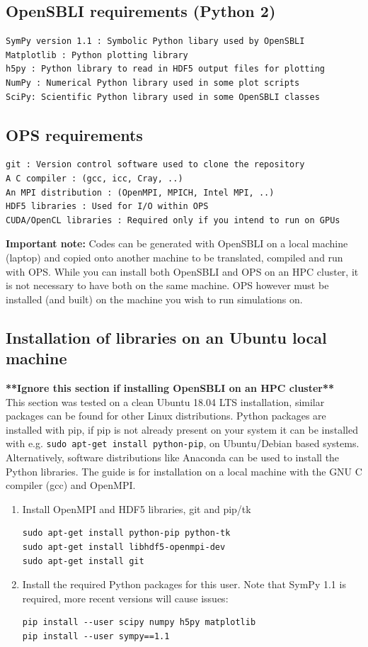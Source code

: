 \documentclass[11pt]{article}
\begin{document}
\subsection*{OpenSBLI requirements (Python 2)}
\begin{verbatim}
SymPy version 1.1 : Symbolic Python libary used by OpenSBLI
Matplotlib : Python plotting library
h5py : Python library to read in HDF5 output files for plotting
NumPy : Numerical Python library used in some plot scripts
SciPy: Scientific Python library used in some OpenSBLI classes
\end{verbatim}
\subsection*{OPS requirements}
\begin{verbatim}
git : Version control software used to clone the repository
A C compiler : (gcc, icc, Cray, ..)
An MPI distribution : (OpenMPI, MPICH, Intel MPI, ..)
HDF5 libraries : Used for I/O within OPS
CUDA/OpenCL libraries : Required only if you intend to run on GPUs
\end{verbatim}
\textbf{Important note:} Codes can be generated with OpenSBLI on a local machine (laptop) and copied onto another machine to be translated, compiled and run with OPS. While you can install both OpenSBLI and OPS on an HPC cluster, it is not necessary to have both on the same machine. OPS however must be installed (and built) on the machine you wish to run simulations on.

\subsection{Installation of libraries on an Ubuntu local machine}
\textbf{**Ignore this section if installing OpenSBLI on an HPC cluster**}\\
This section was tested on a clean Ubuntu 18.04 LTS installation, similar packages can be found for other Linux distributions. Python packages are installed with pip, if pip is not already present on your system it can be installed with e.g. \verb|sudo apt-get install python-pip|, on Ubuntu/Debian based systems. Alternatively, software distributions like Anaconda can be used to install the Python libraries. The guide is for installation on a local machine with the GNU C compiler (gcc) and OpenMPI.

\begin{enumerate}
\item{Install OpenMPI and HDF5 libraries, git and pip/tk
\begin{verbatim}
sudo apt-get install python-pip python-tk
sudo apt-get install libhdf5-openmpi-dev
sudo apt-get install git
\end{verbatim}}
\item{Install the required Python packages for this user. Note that SymPy 1.1 is required, more recent versions will cause issues:}
\begin{verbatim}
pip install --user scipy numpy h5py matplotlib
pip install --user sympy==1.1
\end{verbatim}

\end{enumerate}
\end{document}
